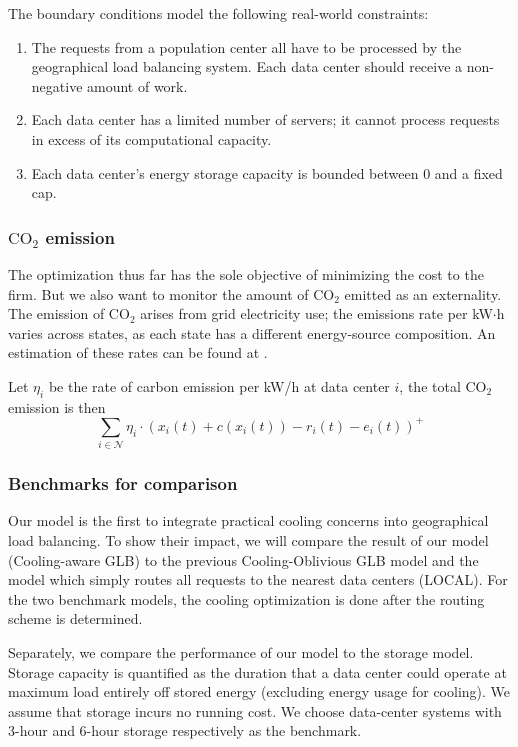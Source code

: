 \documentclass{acm_proc_article-sp}
\newcommand{\carbondioxide}{\ensuremath{\mathrm{CO}_2}}
\begin{document}
The boundary conditions model the following real-world constraints:
\begin{enumerate}
\item
The requests from a population center all have to be processed by the geographical load balancing system. Each data center should receive a non-negative amount of work.
\item
Each data center has a limited number of servers; it cannot process requests in excess of its computational capacity.
\item
Each data center's energy storage capacity is bounded between $0$ and a fixed cap.
\end{enumerate}
\subsubsection{\carbondioxide{} emission}
The optimization thus far has the sole objective of minimizing the cost to the firm. But we also want to monitor the amount of \carbondioxide{} emitted as an externality. The emission of \carbondioxide{} arises from grid electricity use; the emissions rate per kW$\cdot{}$h varies across states, as each state has a different energy-source composition. An estimation of these rates can be found at \cite{carbon}.

Let $\eta_i$ be the rate of carbon emission per kW/h at data center $i$, the total \carbondioxide{} emission is then
$$\sum_{i \in \mathcal{N}} \eta_i \cdot (x_i(t) + c(x_i(t)) - r_i(t) - e_i(t))^+$$
\subsubsection{Benchmarks for comparison}
Our model is the first to integrate practical cooling concerns into geographical load balancing. To show their impact, we will compare the result of our model (Cooling-aware GLB) to the previous Cooling-Oblivious GLB model and the model which simply routes all requests to the nearest data centers (LOCAL). For the two benchmark models, the cooling optimization is done after the routing scheme is determined.

Separately, we compare the performance of our model to the storage model. Storage capacity is quantified as the duration that a data center could operate at maximum load entirely off stored energy (excluding energy usage for cooling). We assume that storage incurs no running cost. We choose data-center systems with 3-hour and 6-hour storage respectively as the benchmark.
\end{document}
